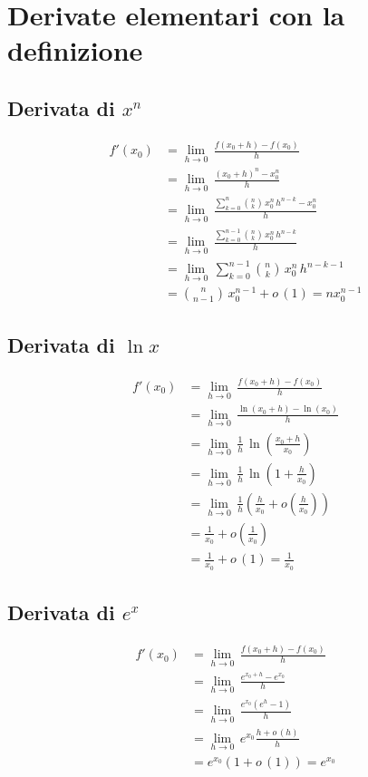 \documentclass[../../dimostrazioni]{subfiles}
\begin{document}
    \chapter{Derivate elementari con la definizione}

        \section*{Derivata di \(x^n\)}
            \begin{align*}
                f'(x_0) &= \lim_{h \to 0} \, \frac{f(x_0 + h) - f(x_0)}{h}\\
                &= \lim_{h \to 0} \, \frac{{(x_0 + h)}^n - x_0^n}{h}\\
                &= \lim_{h \to 0} \, \frac{\sum_{k = 0}^n \binom{n}{k} \, x_0^n \, h^{n - k} - x_0^n}{h}\\
                &= \lim_{h \to 0} \, \frac{\sum_{k = 0}^{n - 1} \binom{n}{k} \, x_0^n \, h^{n - k}}{h}\\
                &= \lim_{h \to 0} \, \sum_{k = 0}^{n - 1} \binom{n}{k} \, x_0^n \, h^{n - k - 1}\\
                &= \binom{n}{n - 1} \, x_0^{n - 1} + o \, (1) = n x_0^{n - 1}
            \end{align*}
            
        \section*{Derivata di \(\ln x\)}
            \begin{align*}
                f'(x_0) &= \lim_{h \to 0} \, \frac{f(x_0 + h) - f(x_0)}{h}\\
                &= \lim_{h \to 0} \, \frac{\ln(x_0 + h) - \ln(x_0)}{h}\\
                &= \lim_{h \to 0} \, \frac{1}{h} \, \ln \left(\frac{x_0 + h}{x_0}\right)\\
                &= \lim_{h \to 0} \, \frac{1}{h} \, \ln \left(1 + \frac{h}{x_0}\right)\\
                &= \lim_{h \to 0} \, \frac{1}{h} \left(\frac{h}{x_0} + o\left(\frac{h}{x_0}\right)\right)\\
                &= \frac{1}{x_0} + o\left(\frac{1}{x_0}\right)\\
                &= \frac{1}{x_0} + o \, (1) = \frac{1}{x_0}
            \end{align*}

        \section*{Derivata di \(e^x\)}
            \begin{align*}
                f'(x_0) &= \lim_{h \to 0} \, \frac{f(x_0 + h) - f(x_0)}{h}\\
                &= \lim_{h \to 0} \, \frac{e^{x_0 + h} - e^{x_0}}{h}\\
                &= \lim_{h \to 0} \, \frac{e^{x_0} (e^h - 1)}{h}\\
                &= \lim_{h \to 0} \, e^{x_0} \frac{h + o \, (h)}{h}\\
                &= e^{x_0} (1 + o \, (1)) = e^{x_0}
            \end{align*}
\end{document}

